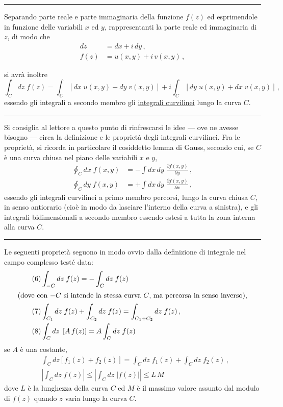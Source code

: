 \documentclass[11pt, a4paper]{book}
\numberwithin{equation}{section}
\begin{document}
\noindent\rule{\linewidth}{0.4pt}

Separando parte reale e parte immaginaria della funzione $f(z)$ ed esprimendole in funzione delle variabili $x$ ed $y$, rappresentanti la parte reale ed immaginaria di $z$, di modo che
\begin{align}
dz &= dx + i\,dy\,, \tag{3}\\
f(z) &= u(x,y) + i\,v(x,y)\,, \tag{4}
\end{align}


si avrà inoltre
\begin{equation}
\int_C dz\;f(z) = \int_C \left[dx\;u(x,y) - dy\;v(x,y)\right] + i\int_C\left[dy\;u(x,y) + dx\;v(x,y)\right]\,, \tag{5}
\end{equation}
essendo gli integrali a secondo membro gli \underline{integrali curvilinei} lungo la curva $C$.

\noindent\rule{\linewidth}{0.4pt}

Si consiglia al lettore a questo punto di rinfrescarsi le idee --- ove ne avesse bisogno --- circa la definizione e le proprietà degli integrali curvilinei. Fra le proprietà, si ricorda in particolare il cosiddetto lemma di Gauss, secondo cui, se $C$ è una curva chiusa nel piano delle variabili $x$ e $y$,
\begin{align*}
\oint_C dx\; f(x,y) &= -\int dx\,dy\;\frac{\partial f(x,y)}{\partial y}\,, \\
\oint_C dy\; f(x,y) &= +\int dx\,dy\;\frac{\partial f(x,y)}{\partial x}\,,
\end{align*}
essendo gli integrali curvilinei a primo membro percorsi, lungo la curva chiusa $C$, in senso antiorario (cioè in modo da lasciare l'interno della curva a sinistra), e gli integrali bidimensionali a secondo membro essendo estesi a tutta la zona interna alla curva $C$.

\noindent\rule{\linewidth}{0.4pt}

Le seguenti proprietà seguono in modo ovvio dalla definizione di integrale nel campo complesso testé data:
\begin{align}
\tag{6} &\int_{-C} dz\; f(z) = -\int_C dz\; f(z) \\
\intertext{(dove con $-C$ si intende la stessa curva $C$, ma percorsa in senso inverso),}
\tag{7} &\int_{C_1} dz\; f(z) + \int_{C_2} dz\; f(z) = \int_{C_1+C_2} dz\; f(z)\,, \\
\tag{8} &\int_C dz\;\left[A\,f(z)\right] = A\int_C dz\; f(z)
\end{align}
se $A$ è una costante,
\begin{align}
\tag{9} &\int_C dz\left[f_1(z) + f_2(z)\right] = \int_C dz\; f_1(z) + \int_C dz\; f_2(z)\,, \\
\tag{10} &\left|\int_C dz\; f(z)\right| \leq \left|\int_C dz\;|f(z)|\right| \leq L\,M
\end{align}
dove $L$ è la lunghezza della curva $C$ ed $M$ è il massimo valore assunto dal modulo di $f(z)$ quando $z$ varia lungo la curva $C$.
\end{document}
